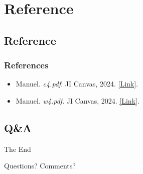 \documentclass[
	11pt, %
]{beamer}
\begin{document}


\section{Reference}

\subsection{Reference}

\begin{frame} %
	\frametitle{References}
	
	\begin{itemize}
    \item Manuel. \textit{c4.pdf}. JI Canvas, 2024. \href{https://jicanvas.com/courses/917/files/folder/lectures?preview=333614}{[Link]}.

    \item Manuel. \textit{w4.pdf}. JI Canvas, 2024. \href{https://jicanvas.com/courses/917/files/folder/worksheets?preview=333632}{[Link]}.

\end{itemize}
\end{frame}


\subsection{Q\&A}
\begin{frame}[plain] %
	\begin{center}
		{\Huge The End}
		
		\bigskip\bigskip %
		
		{\LARGE Questions? Comments?}
	\end{center}
\end{frame}

\end{document}
